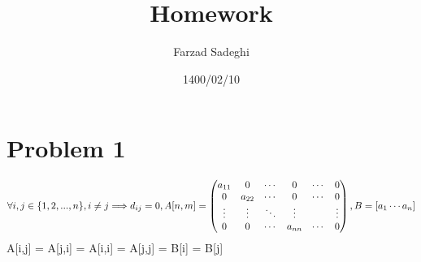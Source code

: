 \documentclass{article}
\title{Homework}
\author{Farzad Sadeghi}
\date{1400/02/10}
\begin{document}
\maketitle
\section{Problem 1}

\begin{equation*}
  \forall i,j \in \{1,2,...,n\}, i \neq j \Longrightarrow d_{ij} = 0,\\
  A[n,m] =
  \begin{pmatrix}
    a_{11}&0&\cdots&0&\cdots&0\\
    0&a_{22}&\cdots&0&\cdots&0\\
    \vdots&\vdots&\ddots&\vdots&&\vdots\\
    0&0&\cdots&a_{nn}&\cdots&0
  \end{pmatrix}
  ,
  B = [a_1 \cdots a_n]
\end{equation*}
A[i,j] = A[j,i] = A[i,i] = A[j,j] = B[i] = B[j]
\end{document}
